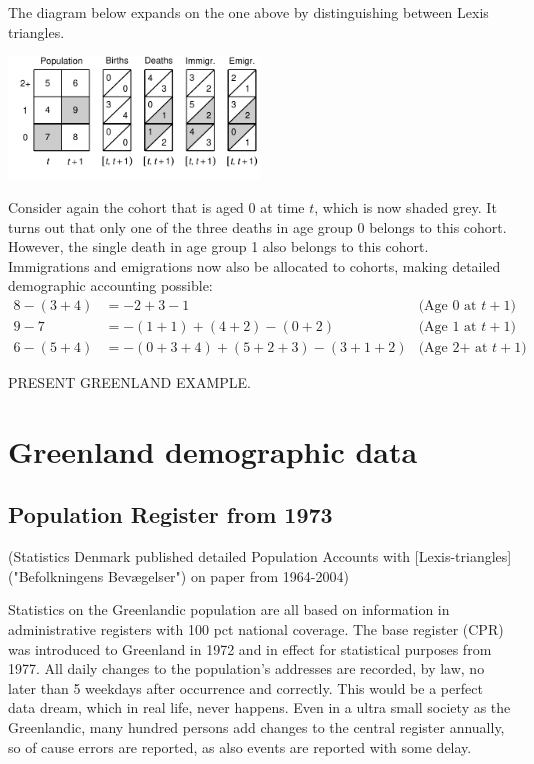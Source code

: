 \documentclass[USenglish]{article}
\begin{document}
The diagram below expands on the one above by distinguishing between Lexis triangles.
\begin{center}
\includegraphics[width=0.5\textwidth]{figures_accounts/fig_account_withage_lex.pdf}
\end{center}
Consider again the cohort that is aged 0 at time $t$, which is now shaded grey. It turns out that only one of the three deaths in age group 0 belongs to this cohort. However, the single death in age group 1 also belongs to this cohort. Immigrations and emigrations now also be allocated to cohorts, making detailed demographic accounting possible:
\begin{align}
    8 - (3 + 4) & = -2 + 3 - 1 & \text{(Age 0 at $t+1$)} \\   
    9 - 7 & = -(1 + 1) + (4 + 2) - (0 + 2) & \text{(Age 1 at $t+1$)} \\
    6 - (5 + 4) & = -(0 + 3 + 4) + (5 + 2 + 3) - (3 + 1 + 2)  & \text{(Age 2+ at $t+1$)}
\end{align}

PRESENT GREENLAND EXAMPLE.


\section{Greenland demographic data}

\subsection{Population Register from 1973} 

(Statistics Denmark published detailed Population Accounts with [Lexis-triangles]("Befolkningens Bevægelser") on paper from 1964-2004)

Statistics on the Greenlandic population are all based on information in administrative registers with 100 pct national coverage. The base register (CPR) was introduced to Greenland in 1972 and in effect for statistical purposes from 1977. All daily changes to the population’s addresses are recorded, by law, no later than 5 weekdays after occurrence and correctly. This would be a perfect data dream, which in real life, never happens. Even in a ultra small society as the Greenlandic, many hundred persons add changes to the central register annually, so of cause errors are reported, as also events are reported with some delay.
\end{document}
